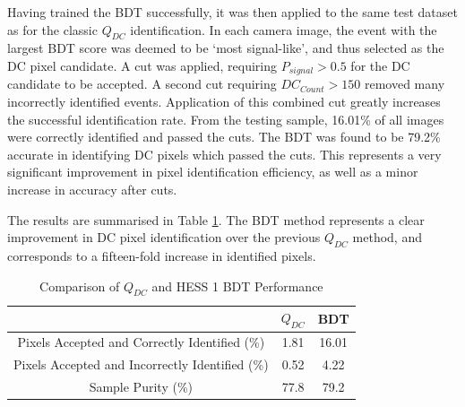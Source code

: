 \documentclass{article}
\begin{document}
Having trained the BDT successfully, it was then applied to the same test dataset as for the classic $Q_{DC}$ identification. In each camera image, the event with the largest BDT score was deemed to be \textquoteleft most signal-like', and thus selected as the DC pixel candidate. A cut was applied, requiring $P_{signal} > 0.5$ for the DC candidate to be accepted. A second cut requiring $DC_{Count} > 150$ removed many incorrectly identified events. Application of this combined cut greatly increases the successful identification rate. From the testing sample, 16.01\% of all images were correctly identified and passed the cuts. The BDT was found to be 79.2\% accurate in identifying DC pixels which passed the cuts. This represents a very significant improvement in pixel identification efficiency, as well as a minor increase in accuracy after cuts. 

The results are summarised in Table \ref{tab:qdcbdtcomparison1}. The BDT method represents a clear improvement in DC pixel identification over the previous $Q_{DC}$ method, and corresponds to a fifteen-fold increase in identified pixels. 

\begin{table}[h!]
  \centering
  \caption{Comparison of $Q_{DC}$ and HESS 1 BDT Performance}
  \label{tab:qdcbdtcomparison1}
  \begin{tabular}{ccc}
    \toprule
    & $Q_{DC}$ & BDT\\
    \midrule
    Pixels Accepted and Correctly Identified (\%)  & 1.81 & 16.01\\
   Pixels Accepted and Incorrectly Identified (\%)  & 0.52& 4.22\\
    Sample Purity (\%)  & 77.8 & 79.2 \\
    \bottomrule
  \end{tabular}
\end{table}
\end{document}
